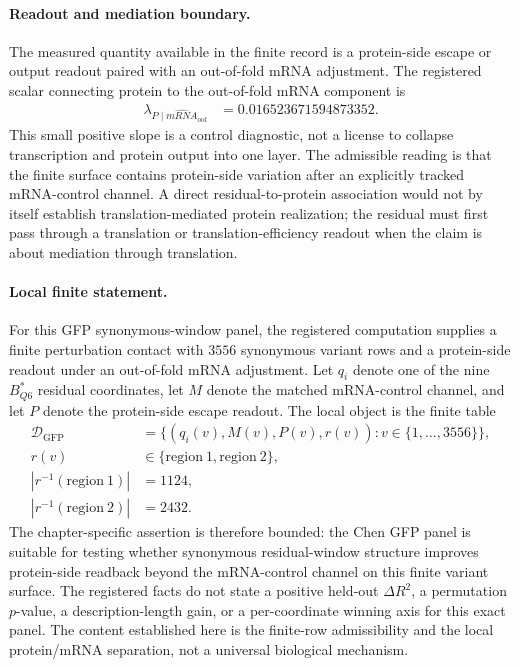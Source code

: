\paragraph{Readout and mediation boundary.}
The measured quantity available in the finite record is a protein-side escape or output readout paired with an out-of-fold mRNA adjustment.  The registered scalar connecting protein to the out-of-fold mRNA component is
$$
\begin{aligned}
  \lambda_{P\mid \widehat{mRNA}_{\mathrm{oof}}} &= 0.016523671594873352.
\end{aligned}
$$
This small positive slope is a control diagnostic, not a license to collapse transcription and protein output into one layer.  The admissible reading is that the finite surface contains protein-side variation after an explicitly tracked mRNA-control channel.  A direct residual-to-protein association would not by itself establish translation-mediated protein realization; the residual must first pass through a translation or translation-efficiency readout when the claim is about mediation through translation.

\paragraph{Local finite statement.}
For this GFP synonymous-window panel, the registered computation supplies a finite perturbation contact with $3556$ synonymous variant rows and a protein-side readout under an out-of-fold mRNA adjustment.  Let $q_i$ denote one of the nine $B^{\ast}_{Q6}$ residual coordinates, let $M$ denote the matched mRNA-control channel, and let $P$ denote the protein-side escape readout.  The local object is the finite table
$$
\begin{aligned}
  \mathcal{D}_{\mathrm{GFP}}
    &= \{(q_i(v), M(v), P(v), r(v)) : v \in \{1,\ldots,3556\}\},\\
  r(v) &\in \{\mathrm{region\ 1},\mathrm{region\ 2}\},\\
  |r^{-1}(\mathrm{region\ 1})| &= 1124,\\
  |r^{-1}(\mathrm{region\ 2})| &= 2432.
\end{aligned}
$$
The chapter-specific assertion is therefore bounded: the Chen GFP panel is suitable for testing whether synonymous residual-window structure improves protein-side readback beyond the mRNA-control channel on this finite variant surface.  The registered facts do not state a positive held-out $\Delta R^2$, a permutation $p$-value, a description-length gain, or a per-coordinate winning axis for this exact panel.  The content established here is the finite-row admissibility and the local protein/mRNA separation, not a universal biological mechanism.

